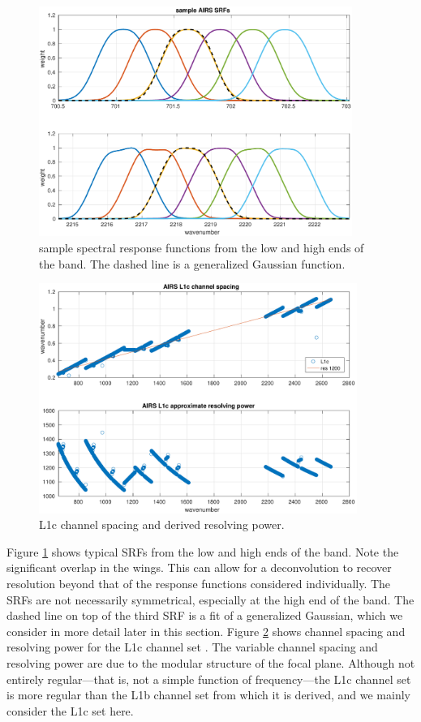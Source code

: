 \documentclass[11pt]{article}
\begin{document}
\begin{figure} %
  \centering
  \includegraphics[height=7.5cm]{figures/airs_sample_srfs.pdf}
  \caption{sample {\airs} spectral response functions from the low
    and high ends of the band.   The dashed line is a generalized
    Gaussian function.}
  \label{srfs1}
\end{figure}

\begin{figure} %
  \centering
  \includegraphics[height=7.5cm]{figures/airs_L1c_res.pdf}
  \caption{{\airs} L1c channel spacing and derived resolving
    power.}
  \label{chan1}
\end{figure}

Figure \ref{srfs1} shows typical {\airs} SRFs from the low and high
ends of the band.  Note the significant overlap in the wings.  This
can allow for a deconvolution to recover resolution beyond that of
the response functions considered individually.  The SRFs are not
necessarily symmetrical, especially at the high end of the band.
The dashed line on top of the third SRF is a fit of a generalized
Gaussian, which we consider in more detail later in this section.
Figure \ref{chan1} shows channel spacing and resolving power for the
{\airs} L1c channel set \cite{airs1c}.  The variable channel spacing
and resolving power are due to the modular structure of the focal
plane.  Although not entirely regular---that is, not a simple
function of frequency---the L1c channel set is more regular than the
L1b channel set from which it is derived, and we mainly consider the
L1c set here.
\end{document}
